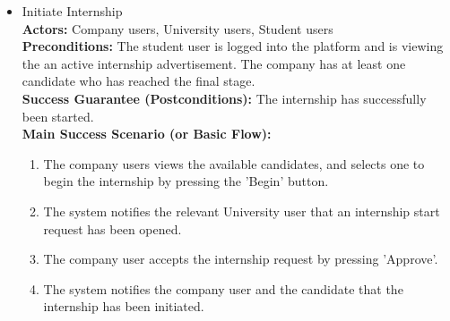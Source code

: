 \begin{itemize}[label={[\textbf{UC}]}, align=left, leftmargin=*]
        
    \item {} Initiate Internship \\
    \textbf{Actors:} Company users, University users, Student users\\
     \textbf{Preconditions:} The student user is logged into the platform and is viewing the an active internship advertisement. The company has at least one candidate who has reached the final stage.\\
     \textbf{Success Guarantee (Postconditions):} The internship has successfully been started. \\
     \textbf{Main Success Scenario (or Basic Flow):} 
     \begin{enumerate}[label=\arabic*.] 
        \item The company users views the available candidates, and selects one to begin the internship by pressing the 'Begin' button.
        \item The system notifies the relevant University user that an internship start request has been opened.
        \item The company user accepts the internship request by pressing 'Approve'.
        \item The system notifies the company user and the candidate that the internship has been initiated.
     \end{enumerate} \\


\end{itemize}
